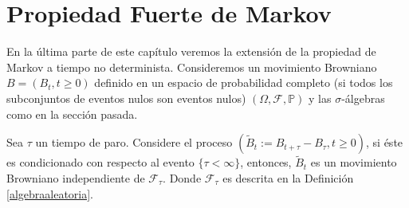 \section{Propiedad Fuerte de Markov}
En la última parte de este capítulo veremos la extensión de la propiedad de Markov a tiempo no determinista. Consideremos un movimiento Browniano $B = (B_t, t \geq 0)$ definido en un espacio de probabilidad completo (si todos los subconjuntos de eventos nulos son eventos nulos) $(\Omega, \mathcal{F}, \mathbb{P})$ y las $\sigma$-álgebras como en la sección pasada.

\begin{theorem} \label{markov-fuerte}
Sea $\tau$ un tiempo de paro. Considere el proceso $(\tilde{B}_t := B_{t + \tau} - B_{\tau}, t \geq 0)$, si éste es condicionado con respecto al evento $\{ \tau < \infty \}$, entonces, $\tilde{B}_t$ es un movimiento Browniano independiente de $\mathcal{F}_{\tau}$. Donde $\mathcal{F}_{\tau}$ es descrita en la Definición \ref{algebraaleatoria}.
\end{theorem}
